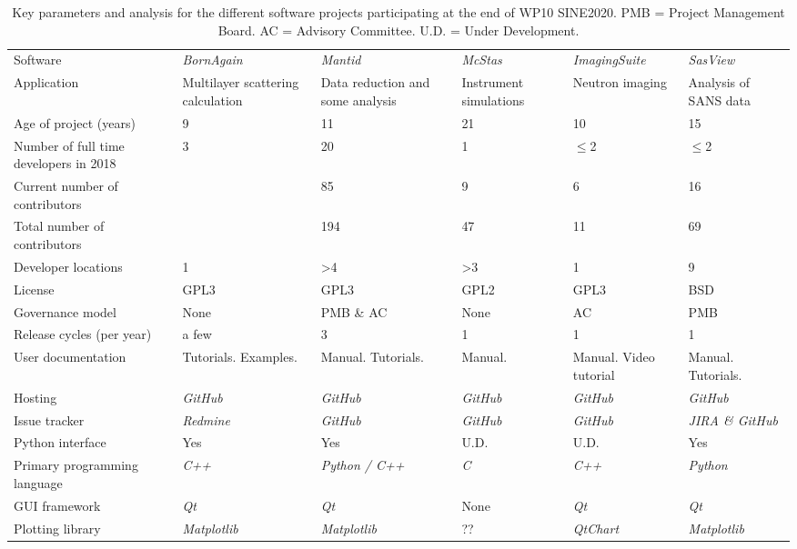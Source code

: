\documentclass[jnr]{iosart2x}
\begin{document}
\begin{table}
 \begin{tabular}{llllll}
 Software                        & \it BornAgain \cite{bornagain}  & \it Mantid \cite{mantid} &\it McStas \cite{mcstas}  & \it ImagingSuite \cite{ImagingSuite} &\it  SasView \cite{sasview} \\
 Application                     & Multilayer scattering calculation & Data reduction and some analysis & Instrument simulations & Neutron imaging & Analysis of SANS data \\
 Age of project (years)          & 9 & 11 & 21 & 10 & 15 \\
 Number of full time developers in 2018 & 3 & 20 & 1 & $\le$2 & $\le$2 \\
 Current number of contributors  &  & 85  & 9 & 6 & 16 \\
 Total number of contributors    &  & 194 & 47 & 11 & 69 \\
 Developer locations             & 1 & >4 & >3 & 1 & 9 \\
 License                         & GPL3 & GPL3 & GPL2 & GPL3 & BSD \\
 Governance model                & None & PMB \& AC  & None & AC & PMB \\
 Release cycles (per year)       & a few & 3 & 1 & 1 & 1\\
 User documentation              & Tutorials. Examples. & Manual. Tutorials. & Manual. & Manual. Video tutorial & Manual. Tutorials. \\
 Hosting         & \it GitHub & \it GitHub & \it GitHub & \it GitHub & \it GitHub \\
 Issue tracker   & \it Redmine & \it GitHub & \it GitHub & \it GitHub & \it JIRA \& \it GitHub \\
 Python interface & Yes & Yes & U.D. & U.D. & Yes \\
 Primary programming language & \it C++ & \it Python / \it C++ & \it C & \it C++ & \it Python \\
 GUI framework    & \it Qt & \it Qt & None & \it Qt & \it Qt \\
 Plotting library & \it Matplotlib & \it Matplotlib & ?? & \it QtChart & \it Matplotlib \\
 \end{tabular}
 \caption{Key parameters and analysis for the different software projects participating at the end of WP10 SINE2020.
PMB = Project Management Board.
AC = Advisory Committee.
U.D. = Under Development.}
\label{summaryTable}
\end{table}
\end{document}
